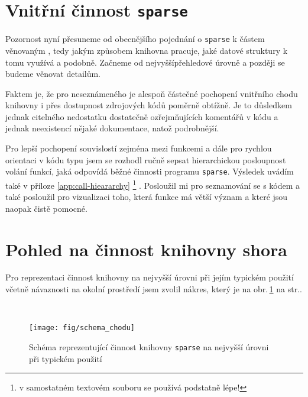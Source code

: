 \section{Vnitřní činnost \texttt{sparse}}

Pozornost nyní přesuneme od obecnějšího pojednání o \texttt{sparse}
k částem věnovaným , tedy jakým způsobem knihovna pracuje,
jaké datové struktury k tomu využívá a podobně. Začneme od nejvyšší\ndash{}přehledové
úrovně a později se budeme věnovat detailům.

Faktem je, že pro neseznámeného je alespoň částečné pochopení vnitřního
chodu knihovny i přes dostupnost zdrojových kódů poměrně obtížně.
Je to důsledkem jednak citelného nedostatku dostatečně
ozřejmňujících komentářů v kódu a jednak neexistencí nějaké
dokumentace, natož podrobnější.

Pro lepší pochopení souvislostí
zejména mezi funkcemi a dále pro rychlou orientaci v kódu typu
 jsem se rozhodl ručně sepsat hierarchickou posloupnost
volání funkcí, jaká odpovídá běžné činnosti programu \texttt{sparse}.
Výsledek uvádím také v příloze \ref{app:call-hieararchy}%
%
\footnote{v samostatném textovém souboru se používá podstatně lépe!}%
%
.
Posloužil mi pro seznamování se s kódem a také posloužil
pro vizualizaci toho, která funkce má větší význam a které jsou
naopak čistě pomocné.

\section{Pohled na činnost knihovny shora}

Pro reprezentaci činnost knihovny na nejvyšší úrovni
při jejím typickém použití včetně návaznosti na okolní
prostředí jsem zvolil nákres, který je na obr.\,\ref{fig:chod} na str.\pageref{fig:chod}.

\hspace*{\fill}\\[-\baselineskip]
\begin{figure}[!h]
    \begin{center}
        \texttt{[image: fig/schema\_chodu]}
        \label{fig:chod}
        \caption{Schéma reprezentující činnost knihovny \texttt{sparse} na nejvyšší úrovni
                 při typickém použití}
    \end{center}
\end{figure}

